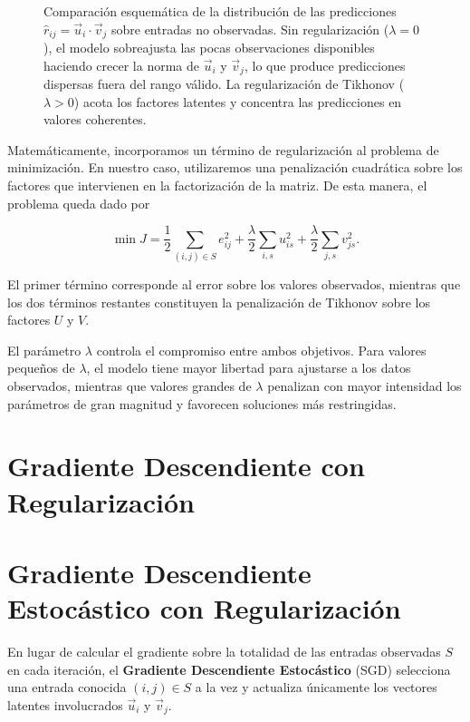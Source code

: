 \begin{figure}[htbp]
\begin{tikzpicture}[
		scale=1.0, every node/.style={transform shape},
		axis/.style={-Stealth, thick, black!80}
		]
	\end{tikzpicture}
	\caption{Comparación esquemática de la distribución de las predicciones $\hat{r}_{ij} = \vec{u}_i \cdot \vec{v}_j$ sobre entradas no observadas. Sin regularización ($\lambda = 0$), el modelo sobreajusta las pocas observaciones disponibles haciendo crecer la norma de $\vec{u}_i$ y $\vec{v}_j$, lo que produce predicciones dispersas fuera del rango válido. La regularización de Tikhonov ($\lambda > 0$) acota los factores latentes y concentra las predicciones en valores coherentes.}
	\label{fig:tikhonov_predictions}
\end{figure}

Matemáticamente, incorporamos un término de regularización al problema de minimización. En nuestro caso, utilizaremos una penalización cuadrática sobre los factores que intervienen en la factorización de la matriz. De esta manera, el problema queda dado por

$$
\min J =
\frac{1}{2}\sum_{(i,j)\in S}e_{ij}^{2}
+
\frac{\lambda}{2}\sum_{i,s}u_{is}^{2}
+
\frac{\lambda}{2}\sum_{j,s}v_{js}^{2}.
$$

El primer término corresponde al error sobre los valores observados, mientras que los dos términos restantes constituyen la penalización de Tikhonov sobre los factores $U$ y $V$.

El parámetro $\lambda$ controla el compromiso entre ambos objetivos. Para valores pequeños de $\lambda$, el modelo tiene mayor libertad para ajustarse a los datos observados, mientras que valores grandes de $\lambda$ penalizan con mayor intensidad los parámetros de gran magnitud y favorecen soluciones más restringidas.


\section{Gradiente Descendiente con Regularización} 
\section{Gradiente Descendiente Estocástico con Regularización}

En lugar de calcular el gradiente sobre la totalidad de las entradas observadas $S$ en cada iteración, el \textbf{Gradiente Descendiente Estocástico} (SGD) selecciona una entrada conocida $(i,j) \in S$ a la vez y actualiza únicamente los vectores latentes involucrados $\vec{u}_i$ y $\vec{v}_j$.

